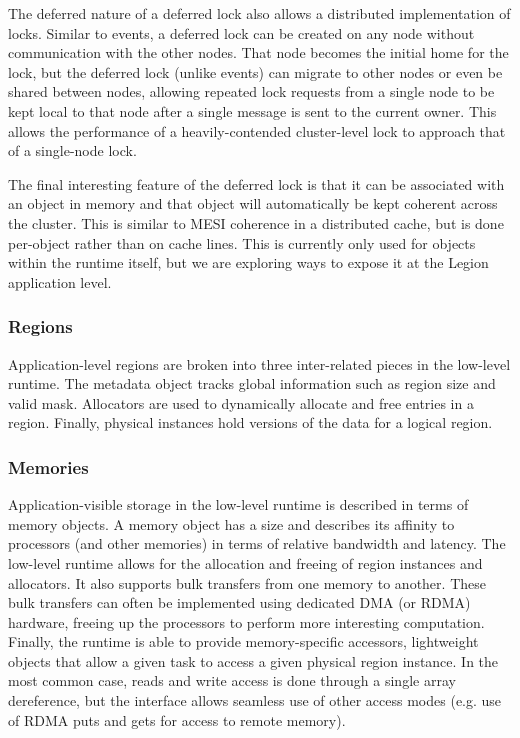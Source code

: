 The deferred nature of a deferred lock also allows a distributed implementation
of locks.  Similar to events, a deferred lock can be created on any node
without communication with the other nodes.  That node becomes
the initial home for the lock, but the deferred lock (unlike events) can 
migrate to other nodes or even be shared between nodes, allowing repeated
lock requests from a single node to be kept local to that node after a single
message is sent to the current owner.  
This allows the performance of a
heavily-contended cluster-level lock to approach that of a single-node lock.

The final interesting feature of the deferred lock is that it can be associated
with an object in memory and that object will automatically be kept coherent
across the cluster.  This is similar to MESI coherence in a distributed cache,
but is done per-object rather than on cache lines.  This is currently only 
used for objects within the runtime itself, but we are exploring ways to expose
it at the Legion application level.

\subsubsection{Regions}
\label{subsec:regionmeta}
Application-level regions are broken into three inter-related pieces in the
low-level runtime.  The metadata object tracks global information such as
region size and valid mask.  Allocators are used to dynamically allocate and
free entries in a region.  Finally, physical instances hold versions of the data for 
a logical region.

\subsubsection{Memories}
\label{subsec:memories}
Application-visible storage in the low-level runtime is described in terms of
memory objects.  A memory object has a size and describes its affinity to 
processors (and other memories) in terms of relative bandwidth and latency.
The low-level runtime allows for the allocation and freeing of region instances
and allocators.  It also supports bulk transfers from one memory to another.
These bulk transfers can often be implemented using dedicated DMA (or RDMA)
hardware, freeing up the processors to perform more interesting
computation.  Finally, the runtime is able to provide memory-specific accessors,
lightweight objects that allow a given task to access a given physical region
instance.  In the most common case, reads and write access is done through a 
single array dereference, but the interface allows seamless use of other
access modes (e.g. use of RDMA puts and gets for access to remote memory).

